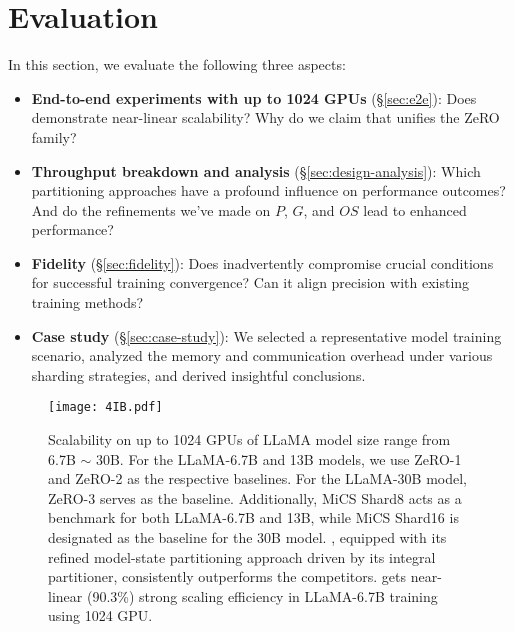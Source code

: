 \section{Evaluation}
\label{sec_evaluation}

In this section, we evaluate the following three aspects:
\begin{itemize}[leftmargin=*]
\item \textbf{End-to-end experiments with up to 1024 GPUs} (\S\ref{sec:e2e}): Does \SysName demonstrate near-linear scalability? Why do we claim that \SysName unifies the ZeRO family?
   
\item \textbf{Throughput breakdown and analysis} (\S\ref{sec:design-analysis}): Which partitioning approaches have a profound influence on performance outcomes? And do the refinements we've made on $P$, $G$, and $OS$ lead to enhanced performance?

\item \textbf{Fidelity} (\S\ref{sec:fidelity}): Does \SysName inadvertently compromise crucial conditions for successful training convergence? Can it align precision with existing training methods?

\item  \textbf{Case study} (\S\ref{sec:case-study}): We selected a representative model training scenario, analyzed the memory and communication overhead under various sharding strategies, and derived insightful conclusions.

\end{itemize}


\begin{figure*}[t]
    \centering
    \texttt{[image: 4IB.pdf]}
    \caption{Scalability on up to 1024 GPUs of LLaMA model size range from 6.7B $\sim$ 30B. For the LLaMA-6.7B and 13B models, we use ZeRO-1 and ZeRO-2 as the respective baselines. For the LLaMA-30B model, ZeRO-3 serves as the baseline. Additionally, MiCS Shard8 acts as a benchmark for both LLaMA-6.7B and 13B, while MiCS Shard16 is designated as the baseline for the 30B model. \SysName, equipped with its refined model-state partitioning approach driven by its integral partitioner, consistently outperforms the competitors. \SysName gets near-linear (90.3\%) strong scaling efficiency in LLaMA-6.7B training using 1024 GPU.}
    \label{4IB}
\end{figure*}


